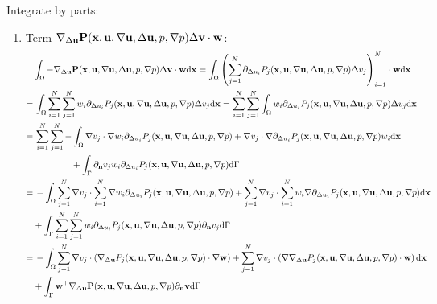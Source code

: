 \documentclass[oneside]{book}
\numberwithin{equation}{section}
\begin{document}
Integrate by parts:
\begin{enumerate}[leftmargin=0in]
    \item Term $\nabla_{\Delta{\bf u}}{\bf P}({\bf x},{\bf u},\nabla{\bf u},\Delta{\bf u},p,\nabla p)\Delta{\bf v}\cdot{\bf w}$:
    \begin{align*}
        &\int_\Omega -\nabla_{\Delta{\bf u}}{\bf P}({\bf x},{\bf u},\nabla{\bf u},\Delta{\bf u},p,\nabla p)\Delta{\bf v}\cdot{\bf w}{\rm d}{\bf x} = \int_\Omega \left(\sum_{j=1}^N \partial_{\Delta u_i}P_j({\bf x},{\bf u},\nabla{\bf u},\Delta{\bf u},p,\nabla p)\Delta v_j\right)_{i=1}^N\cdot{\bf w}{\rm d}{\bf x}\\
        =&\, \int_\Omega \sum_{i=1}^N\sum_{j=1}^N w_i\partial_{\Delta u_i}P_j({\bf x},{\bf u},\nabla{\bf u},\Delta{\bf u},p,\nabla p)\Delta v_j{\rm d}{\bf x} = \sum_{i=1}^N\sum_{j=1}^N \int_\Omega w_i\partial_{\Delta u_i}P_j({\bf x},{\bf u},\nabla{\bf u},\Delta{\bf u},p,\nabla p)\Delta v_j{\rm d}{\bf x}\\
        =&\, \sum_{i=1}^N\sum_{j=1}^N -\int_\Omega \nabla v_j\cdot\nabla w_i\partial_{\Delta u_i}P_j({\bf x},{\bf u},\nabla{\bf u},\Delta{\bf u},p,\nabla p) + \nabla v_j\cdot\nabla\partial_{\Delta u_i}P_j({\bf x},{\bf u},\nabla{\bf u},\Delta{\bf u},p,\nabla p)w_i{\rm d}{\bf x}\\
        &\hspace{15mm}+ \int_\Gamma \partial_{\bf n}v_jw_i\partial_{\Delta u_i}P_j({\bf x},{\bf u},\nabla{\bf u},\Delta{\bf u},p,\nabla p){\rm d}\Gamma\\
        =&\, -\int_\Omega \sum_{j=1}^N \nabla v_j\cdot\sum_{i=1}^N \nabla w_i\partial_{\Delta u_i}P_j({\bf x},{\bf u},\nabla{\bf u},\Delta{\bf u},p,\nabla p) + \sum_{j=1}^N \nabla v_j\cdot\sum_{i=1}^N w_i\nabla\partial_{\Delta u_i}P_j({\bf x},{\bf u},\nabla{\bf u},\Delta{\bf u},p,\nabla p){\rm d}{\bf x}\\
        &+ \int_\Gamma \sum_{i=1}^N\sum_{j=1}^N w_i\partial_{\Delta u_i}P_j({\bf x},{\bf u},\nabla{\bf u},\Delta{\bf u},p,\nabla p)\partial_{\bf n}v_j{\rm d}\Gamma\\
        =&\, -\int_\Omega \sum_{j=1}^N \nabla v_j\cdot\left(\nabla_{\Delta{\bf u}}P_j({\bf x},{\bf u},\nabla{\bf u},\Delta{\bf u},p,\nabla p)\cdot\nabla{\bf w}\right) + \sum_{j=1}^N \nabla v_j\cdot\left(\nabla\nabla_{\Delta{\bf u}}P_j({\bf x},{\bf u},\nabla{\bf u},\Delta{\bf u},p,\nabla p)\cdot{\bf w}\right){\rm d}{\bf x}\\
        &+ \int_\Gamma {\bf w}^\top\nabla_{\Delta{\bf u}}{\bf P}({\bf x},{\bf u},\nabla{\bf u},\Delta{\bf u},p,\nabla p)\partial_{\bf n}{\bf v}{\rm d}\Gamma\\

\end{align*}
\end{enumerate}
\end{document}
